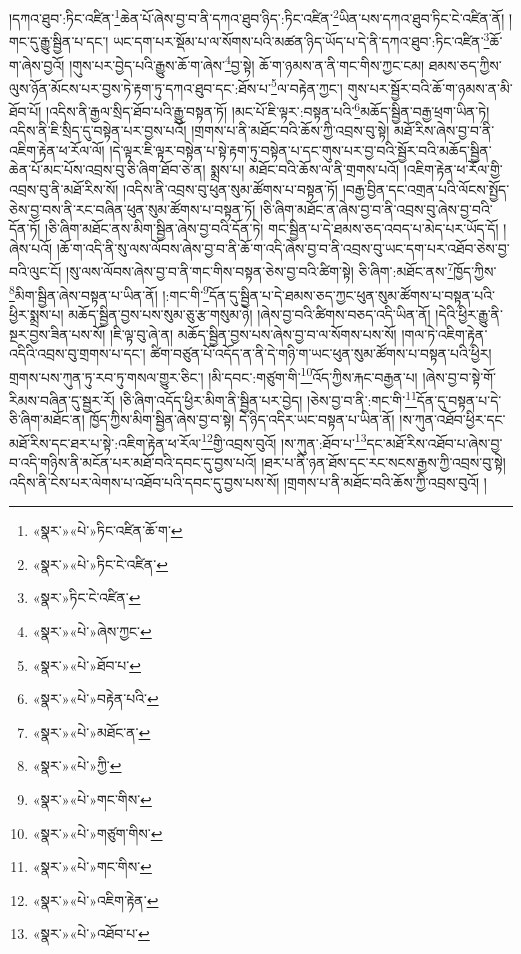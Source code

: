 །དཀའ་ཐུབ་:ཏིང་འཛིན་\footnote{«སྣར་»«པེ་»ཏིང་འཛིན་ཆོ་ག་}ཆེན་པོ་ཞེས་བྱ་བ་ནི་དཀའ་ཐུབ་ཉིད་:ཏིང་འཛིན་\footnote{«སྣར་»«པེ་»ཏིང་ངེ་འཛིན་}ཡིན་པས་དཀའ་ཐུབ་ཏིང་ངེ་འཛིན་ནོ། །གང་དུ་རྒྱུ་སྦྱིན་པ་དང་། ཡང་དག་པར་སྡོམ་པ་ལ་སོགས་པའི་མཚན་ཉིད་ཡོད་པ་དེ་ནི་དཀའ་ཐུབ་:ཏིང་འཛིན་\footnote{«སྣར་»ཏིང་ངེ་འཛིན་}ཆོ་ག་ཞེས་བྱའོ། །གུས་པར་བྱེད་པའི་རྒྱུས་ཆོ་ག་ཞེས་\footnote{«སྣར་»«པེ་»ཞེས་ཀྱང་}བྱ་སྟེ། ཆོ་ག་ཉམས་ན་ནི་གང་གིས་ཀྱང་ངམ། ཐམས་ཅད་ཀྱིས་ལུས་ཉོན་མོངས་པར་བྱས་ཏེ་རྟག་ཏུ་དཀའ་ཐུབ་དང་:ཐོས་པ་\footnote{«སྣར་»«པེ་»ཐོབ་པ་}ལ་བརྟེན་ཀྱང་། གུས་པར་སྦྱོར་བའི་ཆོ་ག་ཉམས་ན་མི་ཐོབ་པོ། །འདིས་ནི་རྒྱལ་སྲིད་ཐོབ་པའི་རྒྱུ་བསྟན་ཏོ། །མང་པོ་ཇི་ལྟར་:བསྟན་པའི་\footnote{«སྣར་»«པེ་»བརྟེན་པའི་}མཆོད་སྦྱིན་བརྒྱ་ཕྲག་ཡིན་ཏེ། འདིས་ནི་ཇི་སྲིད་དུ་བསྟེན་པར་བྱས་པའོ། །གྲགས་པ་ནི་མཐོང་བའི་ཆོས་ཀྱི་འབྲས་བུ་སྟེ། མཐོ་རིས་ཞེས་བྱ་བ་ནི་འཇིག་རྟེན་ཕ་རོལ་ལོ། །དེ་ལྟར་ཇི་ལྟར་བསྟེན་པ་སྟེ་རྟག་ཏུ་བསྟེན་པ་དང་གུས་པར་བྱ་བའི་སྦྱོར་བའི་མཆོད་སྦྱིན་ཆེན་པོ་མང་པོས་འབྲས་བུ་ཅི་ཞིག་ཐོབ་ཅེ་ན། སྨྲས་པ། མཐོང་བའི་ཆོས་ལ་ནི་གྲགས་པའོ། །འཇིག་རྟེན་ཕ་རོལ་གྱི་འབྲས་བུ་ནི་མཐོ་རིས་སོ། །འདིས་ནི་འབྲས་བུ་ཕུན་སུམ་ཚོགས་པ་བསྟན་ཏོ། །བརྒྱ་བྱིན་དང་འགྲན་པའི་ལོངས་སྤྱོད་ཅེས་བྱ་བས་ནི་རང་བཞིན་ཕུན་སུམ་ཚོགས་པ་བསྟན་ཏོ། །ཅི་ཞིག་མཐོང་ན་ཞེས་བྱ་བ་ནི་འབྲས་བུ་ཞེས་བྱ་བའི་དོན་ཏོ། །ཅི་ཞིག་མཐོང་ནས་མིག་སྦྱིན་ཞེས་བྱ་བའི་དོན་ཏེ། གང་སྦྱིན་པ་དེ་ཐམས་ཅད་འབད་པ་མེད་པར་ཡོད་དོ། །ཞེས་པའོ། །ཆོ་ག་འདི་ནི་སུ་ལས་ལོབས་ཞེས་བྱ་བ་ནི་ཆོ་ག་འདི་ཞེས་བྱ་བ་ནི་འབྲས་བུ་ཡང་དག་པར་འཐོབ་ཅེས་བྱ་བའི་ལུང་ངོ། །སུ་ལས་ལོབས་ཞེས་བྱ་བ་ནི་གང་གིས་བསྟན་ཅེས་བྱ་བའི་ཚིག་སྟེ། ཅི་ཞིག་:མཐོང་ནས་\footnote{«སྣར་»«པེ་»མཐོང་ན་}ཁྱོད་ཀྱིས་\footnote{«སྣར་»«པེ་»ཀྱི་}མིག་སྦྱིན་ཞེས་བསྟན་པ་ཡིན་ནོ། །:གང་གི་\footnote{«སྣར་»«པེ་»གང་གིས་}དོན་དུ་སྦྱིན་པ་དེ་ཐམས་ཅད་ཀྱང་ཕུན་སུམ་ཚོགས་པ་བསྟན་པའི་ཕྱིར་སྨྲས་པ། མཆོད་སྦྱིན་བྱས་པས་སུམ་ཅུ་རྩ་གསུམ་ཉེ། །ཞེས་བྱ་བའི་ཚིགས་བཅད་འདི་ཡིན་ནོ། །དེའི་ཕྱིར་རྒྱུ་ནི་སྔར་བྱས་ཟིན་པས་སོ། །ཇི་ལྟ་བུ་ཞེ་ན། མཆོད་སྦྱིན་བྱས་པས་ཞེས་བྱ་བ་ལ་སོགས་པས་སོ། །གལ་ཏེ་འཇིག་རྟེན་འདིའི་འབྲས་བུ་གྲགས་པ་དང་། ཚིག་བཙུན་པོ་འདོད་ན་ནི་དེ་གཉི་ག་ཡང་ཕུན་སུམ་ཚོགས་པ་བསྟན་པའི་ཕྱིར། གྲགས་པས་ཀུན་ཏུ་རབ་ཏུ་གསལ་གྱུར་ཅིང་། །མི་དབང་:གཙུག་གི་\footnote{«སྣར་»«པེ་»གཙུག་གིས་}འོད་ཀྱིས་རྐང་བརྒྱན་པ། །ཞེས་བྱ་བ་སྟེ་གོ་རིམས་བཞིན་དུ་སྦྱར་རོ། །ཅི་ཞིག་འདོད་ཕྱིར་མིག་ནི་སྦྱིན་པར་བྱེད། །ཅེས་བྱ་བ་ནི་:གང་གི་\footnote{«སྣར་»«པེ་»གང་གིས་}དོན་དུ་བསྟན་པ་དེ་ཅི་ཞིག་མཐོང་ན། ཁྱོད་ཀྱིས་མིག་སྦྱིན་ཞེས་བྱ་བ་སྟེ། དེ་ཉིད་འདིར་ཡང་བསྟན་པ་ཡིན་ནོ། །ས་ཀུན་འཐོབ་ཕྱིར་དང་མཐོ་རིས་དང་ཐར་པ་སྟེ་:འཇིག་རྟེན་ཕ་རོལ་\footnote{«སྣར་»«པེ་»འཇིག་རྟེན་}གྱི་འབྲས་བུའོ། །ས་ཀུན་:ཐོབ་པ་\footnote{«སྣར་»«པེ་»འཐོབ་པ་}དང་མཐོ་རིས་འཐོབ་པ་ཞེས་བྱ་བ་འདི་གཉིས་ནི་མངོན་པར་མཐོ་བའི་དབང་དུ་བྱས་པའོ། །ཐར་པ་ནི་ཉན་ཐོས་དང་རང་སངས་རྒྱས་ཀྱི་འབྲས་བུ་སྟེ། འདིས་ནི་ངེས་པར་ལེགས་པ་འཐོབ་པའི་དབང་དུ་བྱས་པས་སོ། །གྲགས་པ་ནི་མཐོང་བའི་ཆོས་ཀྱི་འབྲས་བུའོ། །

